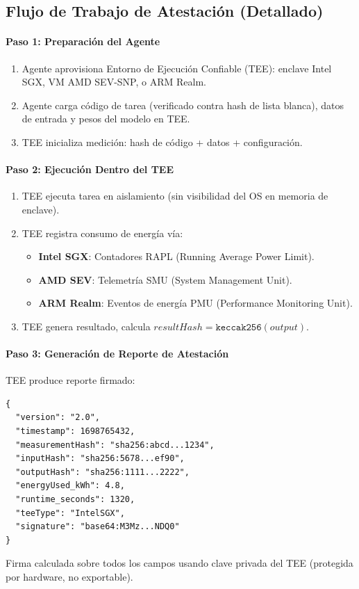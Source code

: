 \documentclass[11pt]{article}
\begin{document}
\subsection{Flujo de Trabajo de Atestación (Detallado)}
\label{sec:attestation-workflow}
\paragraph{Paso 1: Preparación del Agente}
\begin{enumerate}[noitemsep]
  \item Agente aprovisiona Entorno de Ejecución Confiable (TEE): enclave Intel SGX, VM AMD SEV-SNP, o ARM Realm.
  \item Agente carga código de tarea (verificado contra hash de lista blanca), datos de entrada y pesos del modelo en TEE.
  \item TEE inicializa medición: hash de código + datos + configuración.
\end{enumerate}

\paragraph{Paso 2: Ejecución Dentro del TEE}
\begin{enumerate}[noitemsep]
  \item TEE ejecuta tarea en aislamiento (sin visibilidad del OS en memoria de enclave).
  \item TEE registra consumo de energía vía:
    \begin{itemize}[noitemsep]
      \item \textbf{Intel SGX}: Contadores RAPL (Running Average Power Limit).
      \item \textbf{AMD SEV}: Telemetría SMU (System Management Unit).
      \item \textbf{ARM Realm}: Eventos de energía PMU (Performance Monitoring Unit).
    \end{itemize}
  \item TEE genera resultado, calcula $resultHash = \texttt{keccak256}(output)$.
\end{enumerate}

\paragraph{Paso 3: Generación de Reporte de Atestación}
TEE produce reporte firmado:
\begin{verbatim}
{
  "version": "2.0",
  "timestamp": 1698765432,
  "measurementHash": "sha256:abcd...1234",
  "inputHash": "sha256:5678...ef90",
  "outputHash": "sha256:1111...2222",
  "energyUsed_kWh": 4.8,
  "runtime_seconds": 1320,
  "teeType": "IntelSGX",
  "signature": "base64:M3Mz...NDQ0"
}
\end{verbatim}
Firma calculada sobre todos los campos usando clave privada del TEE (protegida por hardware, no exportable).
\end{document}
